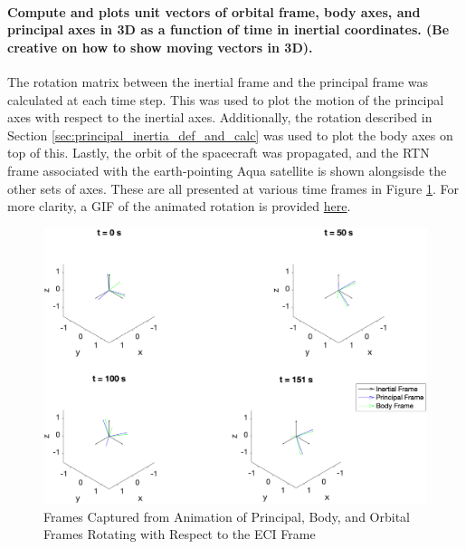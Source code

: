\paragraph{Compute and plots unit vectors of orbital frame, body axes, and principal axes in 3D as a function of time in inertial coordinates. (Be creative on how to show moving vectors in 3D).}

The rotation matrix between the inertial frame and the principal frame was calculated at each time step. This was used to plot the motion of the principal axes with respect to the inertial axes. Additionally, the rotation described in Section \ref{sec:principal_inertia_def_and_calc} was used to plot the body axes on top of this. Lastly, the orbit of the spacecraft was propagated, and the RTN frame associated with the earth-pointing Aqua satellite is shown alongsisde the other sets of axes. These are all presented at various time frames in Figure \ref{fig:frame_rotation}. For more clarity, a GIF of the animated rotation is provided \hyperlink{}{here}.

\begin{figure}[H]
    \centering
    \captionsetup{justification  = centering}
    \includegraphics[width = 15cm]{Images/reference_frame_motion_EA.png}
    \caption{Frames Captured from Animation of Principal, Body, and Orbital Frames Rotating with Respect to the ECI Frame}
    \label{fig:frame_rotation}
\end{figure}